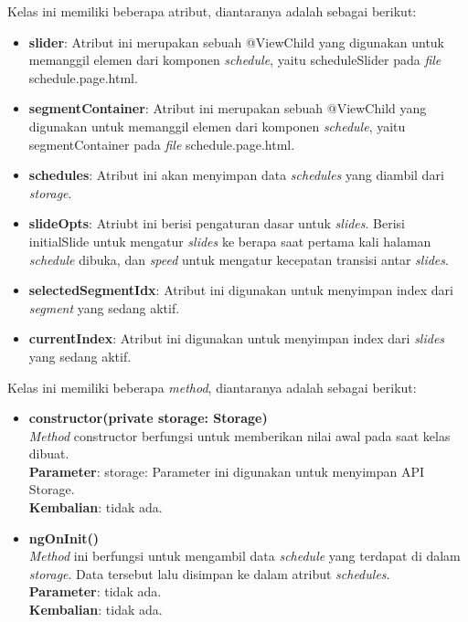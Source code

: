 \begin{enumerate}
			Kelas ini memiliki beberapa atribut, diantaranya adalah sebagai berikut:
			\begin{itemize} 
				\item \textbf{slider}: Atribut ini merupakan sebuah @ViewChild yang digunakan untuk memanggil elemen dari komponen \textit{schedule}, yaitu scheduleSlider pada \textit{file} schedule.page.html.
				\item \textbf{segmentContainer}: Atribut ini merupakan sebuah @ViewChild yang digunakan untuk memanggil elemen dari komponen \textit{schedule}, yaitu segmentContainer pada \textit{file} schedule.page.html.
				\item \textbf{schedules}: Atribut ini akan menyimpan data \textit{schedules} yang diambil dari \textit{storage}.
				\item \textbf{slideOpts}: Atriubt ini berisi pengaturan dasar untuk \textit{slides}. Berisi initialSlide untuk mengatur \textit{slides} ke berapa saat pertama kali halaman \textit{schedule} dibuka, dan \textit{speed} untuk mengatur kecepatan transisi antar \textit{slides}.
				\item \textbf{selectedSegmentIdx}: Atribut ini digunakan untuk menyimpan index dari \textit{segment} yang sedang aktif.
				\item \textbf{currentIndex}: Atribut ini digunakan untuk menyimpan index dari \textit{slides} yang sedang aktif.
			\end{itemize}
			Kelas ini memiliki beberapa \textit{method}, diantaranya adalah sebagai berikut:
			\begin{itemize}
				\item \textbf{constructor(private storage: Storage)}\\ 
					\textit{Method} constructor berfungsi untuk memberikan nilai awal pada saat kelas dibuat. \\
					\textbf{Parameter}: storage: Parameter ini digunakan untuk menyimpan API Storage.\\
					\textbf{Kembalian}: tidak ada.
					
				\item \textbf{ngOnInit()}\\ 
				\textit{Method} ini berfungsi untuk mengambil data \textit{schedule} yang terdapat di dalam \textit{storage}. Data tersebut lalu disimpan ke dalam atribut \textit{schedules}. \\
				\textbf{Parameter}: tidak ada. \\
				\textbf{Kembalian}: tidak ada.
				

\end{itemize}
\end{enumerate}
